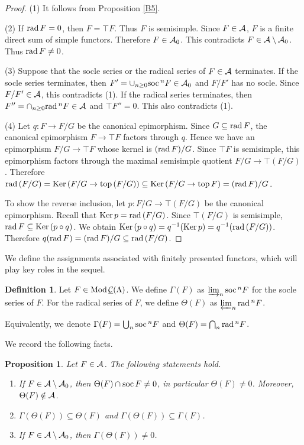\documentclass[11pt]{amsart}
\newtheorem{proposition}[theorem]{Proposition}
\theoremstyle{definition}
\newtheorem{definition}[theorem]{Definition}
\numberwithin{equation}{section}
\begin{document}
\begin{proof}
(1) It follows from Proposition \ref{B5}. 

(2) If $\rad F=0$, then $F = \top F$. 
Thus $F$ is semisimple. 
Since $F\in \AA$, $F$ is a finite direct sum of simple functors. 
Therefore $F\in \AA_0$. 
This contradicts $F\in \AA\setminus \AA_0$. 
Thus $\rad F\neq 0$.

(3) Suppose that the socle series or the radical series of $F \in \AA$ terminates. 
If the socle series terminates, then $F' = \cup_{n \ge 0} \soc^n F \in \AA_0$ and $F/F'$ has no socle. 
Since $F/F' \in \AA$, this contradicts (1). 
If the radical series terminates, then $F'' = \cap_{n \ge 0} \rad^n F \in \AA$ and $\top F'' =0$. 
This also contradicts (1). 

(4) Let $q: F\to F/G$ be the canonical epimorphism. 
Since $G\subseteq \rad F$, the canonical epimorphism $F\to \top F$ factors through $q$. 
Hence we have an epimorphism $F/G \to \top F$ whose kernel is $(\rad F)/G$.
Since $\top F$ is semisimple, this epimorphism factors through the maximal semisimple quotient $F/G\to \top (F/G)$. 
Therefore $\rad (F/G) = \Ker(F/G \to \top(F/G)) \subseteq \Ker(F/G \to \top F) =(\rad F)/G$. 

To show the reverse inclusion, let $p : F/G \to \top (F/G)$ be the canonical epimorphism. 
Recall that $\Ker p = \rad (F/G)$. 
Since $\top (F/G)$ is semisimple, $\rad F \subseteq \Ker (p \circ q)$. 
We obtain $\Ker (p \circ q) = q^{-1} (\Ker p ) = q^{-1} (\rad (F/G))$. 
Therefore $q(\rad F) = (\rad F)/ G \subseteq \rad (F/G)$. 
\end{proof}


We define the assignments associated with finitely presented functors, which will play key roles in the sequel. 

\begin{definition}\label{C5}
Let $F \in \ModsCML$. 
We define $\Gamma (F)$ as $\varinjlim _n \soc ^{n} F$ for the socle series of $F$. 
For the radical series of $F$, we define $\Theta (F)$ as $\varprojlim _n \rad ^{n} F$. 

Equivalently, we denote $\Gamma (F) = \bigcup _n \soc ^n F$ and $\Theta (F) = \bigcap_n \rad^n F$.
\end{definition}


We record the following facts. 

\begin{proposition}\label{C6}
Let $F \in \AA$. The following statements hold.
\begin{enumerate}[\rm(1)]
\item If $F \in \AA \setminus \AA_0$, then $\Theta (F) \cap \soc F \neq 0$, in particular $\Theta (F) \neq 0$. 
Moreover, $\Theta (F) \notin \AA$.  

\item $\Gamma(\Theta(F)) \subseteq \Theta(F)$ and $\Gamma(\Theta(F)) \subseteq \Gamma(F)$. 

\item If $F \in \AA \setminus \AA_0$, then  $\Gamma(\Theta(F)) \neq 0$. 
\end{enumerate}
\end{proposition}
\end{document}
